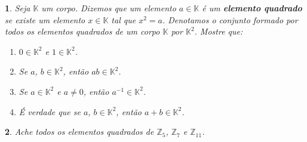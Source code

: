 \documentclass[12pt]{exam}
\newtheorem{exercicio}{}
\newcommand{\z}{\mathbb{Z}}
\newcommand{\cp}[1]{\mathbb{#1}}
\begin{document}
\begin{exercicio}
  Seja $\cp{K}$ um corpo. Dizemos que um elemento $a \in \cp{K}$ \'e um \textbf{elemento quadrado} se existe um elemento $x \in \cp{K}$ tal que $x^2 = a$. Denotamos o conjunto formado por todos os elementos quadrados de um corpo $\cp{K}$ por $\cp{K}^2$. Mostre que:
  \begin{enumerate}[label={\alph*})]
    \item $0 \in \cp{K}^2$ e $1 \in \cp{K}^2$.
    \item Se $a$, $b \in \cp{K}^2$, ent\~ao $ab \in \cp{K}^2$.
    \item Se $a \in \cp{K}^2$ e $a \ne 0$, ent\~ao $a^{-1} \in \cp{K}^2$.
    \item \'E verdade que se $a$, $b \in \cp{K}^2$, ent\~ao $a + b \in \cp{K}^2$.
  \end{enumerate}
\end{exercicio}

\begin{exercicio}
  Ache todos os elementos quadrados de $\z_5$, $\z_7$ e $\z_{11}$.
\end{exercicio}

% 
\end{document}
